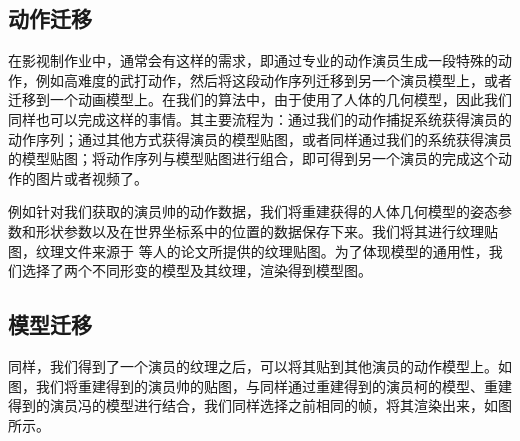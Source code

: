 \subsection{动作迁移}
在影视制作业中，通常会有这样的需求，即通过专业的动作演员生成一段特殊的动作，例如高难度的武打动作，然后将这段动作序列迁移到另一个演员模型上，或者迁移到一个动画模型上。在我们的算法中，由于使用了人体的几何模型，因此我们同样也可以完成这样的事情。其主要流程为：通过我们的动作捕捉系统获得演员的动作序列；通过其他方式获得演员的模型贴图，或者同样通过我们的系统获得演员的模型贴图；将动作序列与模型贴图进行组合，即可得到另一个演员的完成这个动作的图片或者视频了。

例如针对我们获取的演员帅的动作数据，我们将重建获得的人体几何模型的姿态参数和形状参数以及在世界坐标系中的位置的数据保存下来。我们将其进行纹理贴图，纹理文件来源于 等人的论文所提供的纹理贴图\cite{surreal}。为了体现模型的通用性，我们选择了两个不同形变的模型及其纹理，渲染得到模型图。


\subsection{模型迁移}
同样，我们得到了一个演员的纹理之后，可以将其贴到其他演员的动作模型上。如图，我们将重建得到的演员帅的贴图，与同样通过重建得到的演员柯的模型、重建得到的演员冯的模型进行结合，我们同样选择之前相同的帧，将其渲染出来，如图所示。

